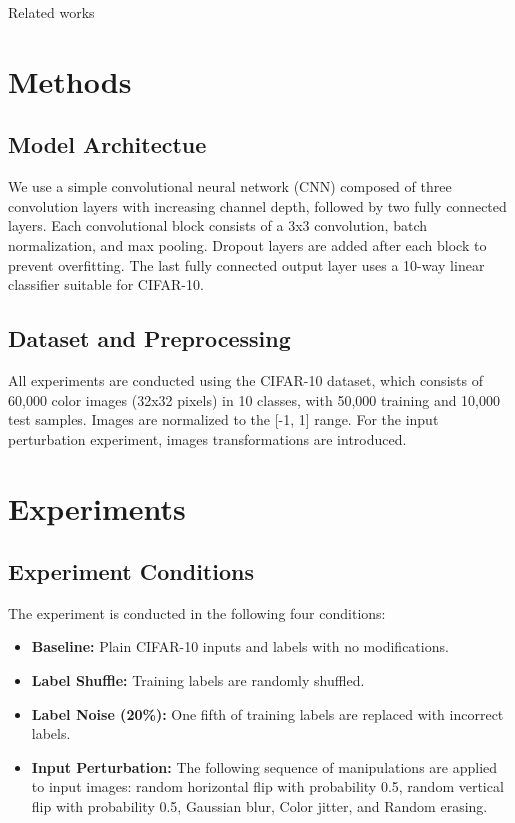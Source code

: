 \documentclass[10pt,twocolumn,letterpaper]{article}
\begin{document}
Related works


\section{Methods}
\label{sec:methods}

\subsection{Model Architectue}
We use a simple convolutional neural network (CNN) composed of three convolution layers with increasing channel depth, followed by two fully connected layers. Each convolutional block consists of a 3x3 convolution, batch normalization, and max pooling. Dropout layers are added after each block to prevent overfitting. The last fully connected output layer uses a 10-way linear classifier suitable for CIFAR-10.

\subsection{Dataset and Preprocessing}
All experiments are conducted using the CIFAR-10 dataset, which consists of 60,000 color images (32x32 pixels) in 10 classes, with 50,000 training and 10,000 test samples. Images are normalized to the [-1, 1] range. For the input perturbation experiment, images transformations are introduced.

\section{Experiments}
\label{sec:experiments}

\subsection{Experiment Conditions}
The experiment is conducted in the following four conditions:
\begin{itemize}
    \item \textbf{Baseline:}
    Plain CIFAR-10 inputs and labels with no modifications.
    \item \textbf{Label Shuffle:}
    Training labels are randomly shuffled.
    \item \textbf{Label Noise (20\%):}
    One fifth of training labels are replaced with incorrect labels.
    \item \textbf{Input Perturbation:}
    The following sequence of manipulations are applied to input images:
    random horizontal flip with probability 0.5,
    random vertical flip with probability 0.5,
    Gaussian blur,
    Color jitter,
    and Random erasing.
\end{itemize}
\end{document}
